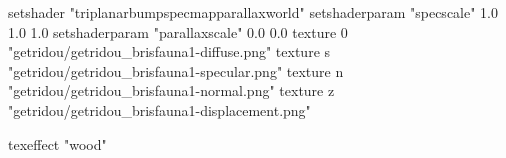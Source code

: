 setshader "triplanarbumpspecmapparallaxworld"
setshaderparam "specscale" 1.0 1.0 1.0
setshaderparam "parallaxscale" 0.0 0.0
texture 0 "getridou/getridou_brisfauna1-diffuse.png"
texture s "getridou/getridou_brisfauna1-specular.png"
texture n "getridou/getridou_brisfauna1-normal.png"
texture z "getridou/getridou_brisfauna1-displacement.png"

texeffect "wood"
